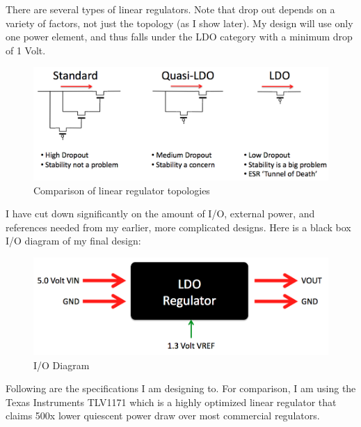 \documentclass[10pt]{amsart}
\begin{document}
There are several types of linear regulators. Note that drop out depends on a variety of factors, not just the topology (as I show later). My design will use only one power element, and thus falls under the LDO category with a minimum drop of 1 Volt.

\begin{figure}[h]
	\begin{center}
		\includegraphics[width=6in]{Media/ldos.png}
	\end{center}
	\caption{Comparison of linear regulator topologies}
	\label{fig:wl}
\end{figure}

I have cut down significantly on the amount of I/O, external power, and references needed from my earlier, more complicated designs. Here is a black box I/O diagram of my final design: 

\begin{figure}[h]
	\begin{center}
		\includegraphics[width=6in]{Media/black.png}
	\end{center}
	\caption{I/O Diagram}
	\label{fig:black}
\end{figure}

Following are the specifications I am designing to. For comparison, I am using the Texas Instruments TLV1171 which is a highly optimized linear regulator that claims 500x lower quiescent power draw over most commercial regulators.
\end{document}
